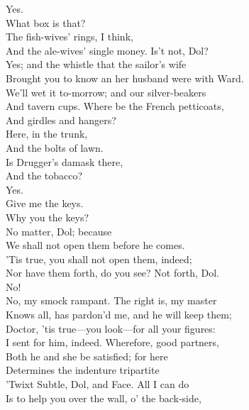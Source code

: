 \documentclass[a4paper,oneside]{memoir}
\begin{document}
\begin{drama*}
\dolspeaks Yes.\\
\facespeaks {} What box is that?\\
\subtlespeaks {} The fish-wives' rings, I think,\\
And the ale-wives' single money. Is't not, Dol?\\
\dolspeaks Yes; and the whistle that the sailor's wife\\
Brought you to know an her husband were with Ward.\\
\facespeaks We'll wet it to-morrow; and our silver-beakers\\
And tavern cups. Where be the French petticoats,\\
And girdles and hangers?\\
\subtlespeaks {} Here, in the trunk,\\
And the bolts of lawn.\\
\facespeaks {} Is Drugger's damask there,\\
And the tobacco?\\
\subtlespeaks {} Yes.\\
\facespeaks {} Give me the keys.\\
\dolspeaks Why you the keys?\\
\subtlespeaks {} No matter, Dol; because\\
We shall not open them before he comes.\\
\facespeaks 'Tis true, you shall not open them, indeed;\\
Nor have them forth, do you see? Not forth, Dol.\\
\dolspeaks No!\\
\facespeaks {} No, my smock rampant. The right is, my master\\
Knows all, has pardon'd me, and he will keep them;\\
Doctor, 'tis true---you look---for all your figures:\\
I sent for him, indeed. Wherefore, good partners,\\
Both he and she be satisfied; for here\\
Determines the indenture tripartite\\
'Twixt Subtle, Dol, and Face. All I can do\\
Is to help you over the wall, o' the back-side,\\

\end{drama*}
\end{document}
